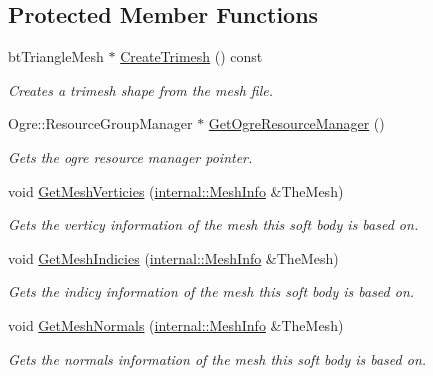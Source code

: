 \subsection*{Protected Member Functions}
\begin{DoxyCompactItemize}
\item 
btTriangleMesh $\ast$ \hyperlink{classphys_1_1ActorBase_af869b78fcac01ee153d495953daab382}{CreateTrimesh} () const 
\begin{DoxyCompactList}\small\item\em Creates a trimesh shape from the mesh file. \item\end{DoxyCompactList}\item 
Ogre::ResourceGroupManager $\ast$ \hyperlink{classphys_1_1ActorBase_afa9b5a1f149182a96a7608f52847b7ed}{GetOgreResourceManager} ()
\begin{DoxyCompactList}\small\item\em Gets the ogre resource manager pointer. \item\end{DoxyCompactList}\item 
void \hyperlink{classphys_1_1ActorBase_a795d9d132ed55fa114f15039dcad9055}{GetMeshVerticies} (\hyperlink{structphys_1_1internal_1_1MeshInfo}{internal::MeshInfo} \&TheMesh)
\begin{DoxyCompactList}\small\item\em Gets the verticy information of the mesh this soft body is based on. \item\end{DoxyCompactList}\item 
void \hyperlink{classphys_1_1ActorBase_acc1e51ff56ec8c9320bcbd4c3cec3f34}{GetMeshIndicies} (\hyperlink{structphys_1_1internal_1_1MeshInfo}{internal::MeshInfo} \&TheMesh)
\begin{DoxyCompactList}\small\item\em Gets the indicy information of the mesh this soft body is based on. \item\end{DoxyCompactList}\item 
void \hyperlink{classphys_1_1ActorBase_a6f6c1ede5fdf787bcc3f34feddacebff}{GetMeshNormals} (\hyperlink{structphys_1_1internal_1_1MeshInfo}{internal::MeshInfo} \&TheMesh)
\begin{DoxyCompactList}\small\item\em Gets the normals information of the mesh this soft body is based on. \item\end{DoxyCompactList}\item 

\end{DoxyCompactItemize}
